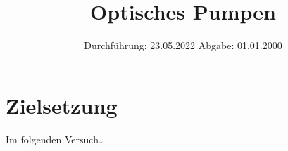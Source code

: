 

\def\Rb#1{\ce{^{#1}Rb}}

\subject{V21}
\title{Optisches Pumpen}
\date{
    Durchführung: 23.05.2022
     \hspace{3em}
    Abgabe: 01.01.2000 %
}


\maketitle
\thispagestyle{empty}
\tableofcontents
\newpage

\section{Zielsetzung}

    Im folgenden Versuch… %


\clearpage


\clearpage


\clearpage


\clearpage

\printbibliography


